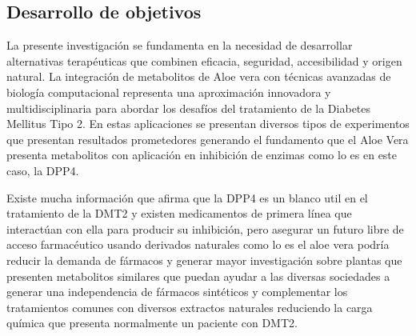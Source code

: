  \subsection{Desarrollo de objetivos}
 La presente investigación se fundamenta en la necesidad de desarrollar alternativas terapéuticas que combinen eficacia, seguridad, accesibilidad y origen natural.
 La integración de metabolitos de Aloe vera con técnicas avanzadas de biología computacional representa una aproximación innovadora y multidisciplinaria para abordar los desafíos del tratamiento de la Diabetes Mellitus Tipo 2.
 En estas aplicaciones se presentan diversos tipos de experimentos que presentan resultados prometedores generando el fundamento que el Aloe Vera presenta metabolitos con aplicación en inhibición de enzimas como lo es en este caso, la DPP4.

 Existe mucha información que afirma que la DPP4 es un blanco util en el tratamiento de la DMT2 y existen medicamentos de primera línea que interactúan con ella para producir su inhibición, pero asegurar un futuro libre de acceso farmacéutico usando derivados naturales como lo es el aloe vera podría reducir la demanda de fármacos y generar mayor investigación sobre plantas que presenten metabolitos similares que puedan ayudar a las diversas sociedades a generar una independencia de fármacos sintéticos y complementar los tratamientos comunes con diversos extractos naturales reduciendo la carga química que presenta normalmente un paciente con DMT2.


 